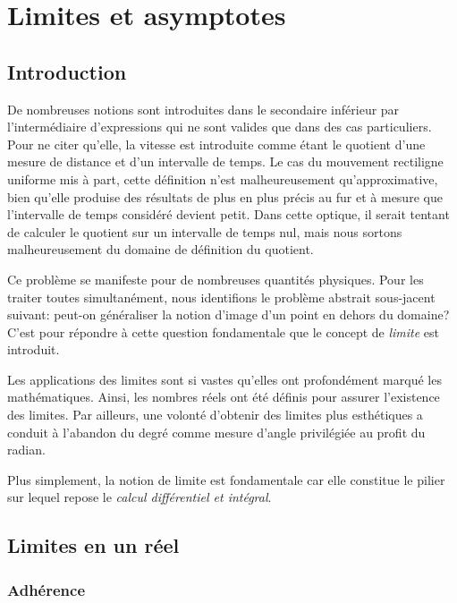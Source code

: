 \documentclass[main.tex]{subfiles}
\begin{document}
\tableofcontents

\chapter{Limites et asymptotes}

\section{Introduction}

De nombreuses notions sont introduites dans le secondaire inférieur par l'intermédiaire d'expressions
qui ne sont valides que dans des cas particuliers.
Pour ne citer qu'elle,
la vitesse est introduite comme étant le quotient d'une mesure de distance et d'un intervalle de temps.
Le cas du mouvement rectiligne uniforme mis à part,
cette définition n'est malheureusement qu'approximative,
bien qu'elle produise des résultats de plus en plus précis
au fur et à mesure que l'intervalle de temps considéré devient petit.
Dans cette optique,
il serait tentant de calculer le quotient sur un intervalle de temps nul,
mais nous sortons malheureusement du domaine de définition du quotient.

Ce problème se manifeste pour de nombreuses quantités physiques.
Pour les traiter toutes simultanément,
nous identifions le problème abstrait sous-jacent suivant:
peut-on généraliser la notion d'image d'un point en dehors du domaine?
C'est pour répondre à cette question fondamentale que le concept de \emph{limite} est introduit.

Les applications des limites sont si vastes
qu'elles ont profondément marqué les mathématiques.
Ainsi, les nombres réels ont été définis pour assurer l'existence des limites.
Par ailleurs,
une volonté d'obtenir des limites plus esthétiques a conduit à l'abandon du degré comme mesure d'angle privilégiée au profit du radian.

Plus simplement,
la notion de limite est fondamentale
car elle constitue le pilier sur lequel repose le \emph{calcul différentiel et intégral}.

\section{Limites en un réel}

\subsection{Adhérence}
\end{document}
